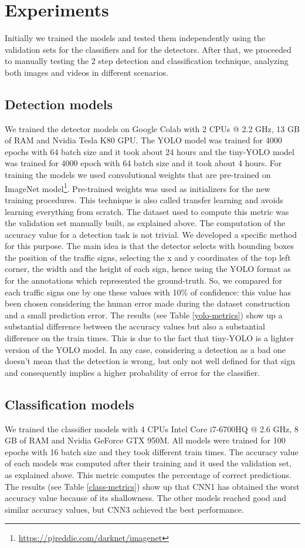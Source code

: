 \documentclass[10pt,twocolumn,letterpaper]{article}
\begin{document}
\section{Experiments}
Initially we trained the models and tested them independently using the validation sets for the classifiers and for the detectors. After that, we proceeded to manually testing the 2 step detection and classification technique, analyzing both images and videos in different scenarios. 


\subsection{Detection models}
We trained the detector models on Google Colab with 2 CPUs @ 2.2 GHz, 13 GB of RAM and Nvidia Tesla K80 GPU. The YOLO model was trained for 4000 epochs with 64 batch size and it took about 24 hours and the tiny-YOLO model was trained for 4000 epoch with 64 batch size and it took about 4 hours.
For training  the models we used convolutional weights that are pre-trained on ImageNet model\footnote{\url{https://pjreddie.com/darknet/imagenet}}. Pre-trained weights was used as initializers for the new training procedures. This technique is also called transfer learning and avoids learning everything from scratch. The dataset used to compute this metric was the validation set manually built, as explained above. The computation of the accuracy value for a detection task is not trivial. We developed a specific method for this purpose. The main idea is that the detector selects with bounding boxes the position of the traffic signs, selecting the x and y coordinates of the top left corner, the width and the height of each sign, hence using the YOLO format as for the annotations which represented the ground-truth. So, we compared for each traffic signs one by one these values with 10\% of confidence: this value has been chosen considering the human error made during the dataset construction and a small prediction error. 
The results (see Table \ref{yolo-metrics}) show up a substantial difference between the accuracy values but also a substantial difference on the train times. This is due to the fact that tiny-YOLO is a lighter version of the YOLO model. In any case, considering a detection as a bad one doesn't mean that the detection is wrong, but only not well defined for that sign and consequently implies a higher probability of error for the classifier.


\subsection{Classification models}
We trained the classifier models with 4 CPUs Intel Core i7-6700HQ @ 2.6 GHz, 8 GB of RAM and Nvidia GeForce GTX 950M. All models were trained for 100 epochs with 16 batch size and they took different train times. The accuracy value of each models was computed after their training and it used the validation set, as explained above. This metric computes the percentage of correct predictions. The results (see Table \ref{class-metrics}) show up that CNN1 has obtained the worst accuracy value because of its shallowness. The other models reached good and similar accuracy values, but CNN3 achieved the best performance.
\end{document}
